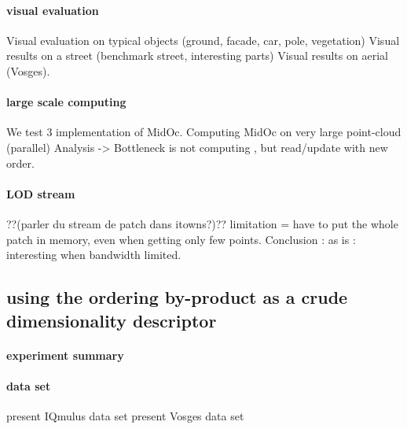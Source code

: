 		\paragraph{visual evaluation}
			Visual evaluation on typical objects (ground, facade, car, pole, vegetation)
			Visual results on a street (benchmark street, interesting parts)
			Visual results on aerial (Vosges).
		\paragraph{large scale computing}
			We test 3 implementation of MidOc.
			Computing MidOc on very large point-cloud (parallel)
			Analysis -> Bottleneck is not computing , but read/update with new order.
		
		\paragraph{LOD stream}
			??(parler du stream de patch dans itowns?)??
			limitation = have to put the whole patch in memory, even when getting only few points.
			Conclusion : as is : interesting when bandwidth limited.  
	\subsection{using the ordering by-product as a crude dimensionality descriptor}
		\paragraph{experiment summary}
		\paragraph{data set}
			present IQmulus data set
			present Vosges data set
		\paragraph{}
		
 